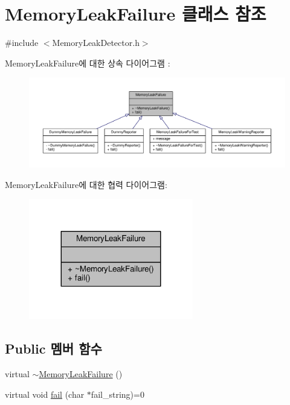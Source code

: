 \hypertarget{class_memory_leak_failure}{}\section{Memory\+Leak\+Failure 클래스 참조}
\label{class_memory_leak_failure}


{\ttfamily \#include $<$Memory\+Leak\+Detector.\+h$>$}



Memory\+Leak\+Failure에 대한 상속 다이어그램 \+: 
\nopagebreak
\begin{figure}[H]
\begin{center}
\leavevmode
\includegraphics[width=350pt]{class_memory_leak_failure__inherit__graph}
\end{center}
\end{figure}


Memory\+Leak\+Failure에 대한 협력 다이어그램\+:
\nopagebreak
\begin{figure}[H]
\begin{center}
\leavevmode
\includegraphics[width=203pt]{class_memory_leak_failure__coll__graph}
\end{center}
\end{figure}
\subsection*{Public 멤버 함수}
\begin{DoxyCompactItemize}
\item 
virtual \hyperlink{class_memory_leak_failure_af9702b83f98eaaf33026539441fb3bf5}{$\sim$\+Memory\+Leak\+Failure} ()
\item 
virtual void \hyperlink{class_memory_leak_failure_a02162a2e65c782866a5acf6b84abc7aa}{fail} (char $\ast$fail\+\_\+string)=0
\end{DoxyCompactItemize}


